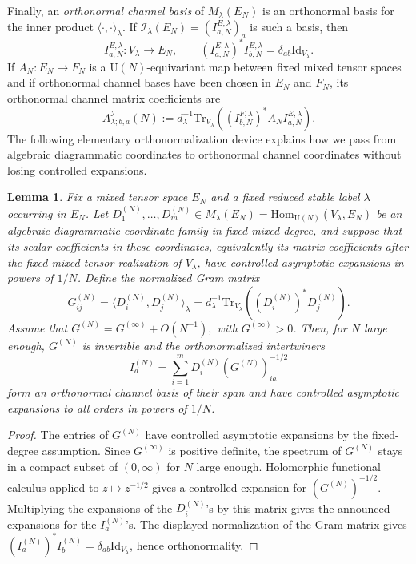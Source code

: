 \documentclass[11pt,a4paper,reqno]{amsart}
\newtheorem{lemma}[theorem]{Lemma}
\theoremstyle{definition}
\theoremstyle{remark}
\newcommand\U{{\mathrm U}}
\newcommand\Tr{{\mathrm{Tr}}}
\newcommand\Id{{\mathrm{Id}}}
\newcommand\Hom{{\mathrm{Hom}}}
\begin{document}
Finally, an \emph{orthonormal channel basis} of $M_\lambda(E_N)$ is an orthonormal basis for the inner product $\langle\cdot,\cdot\rangle_\lambda$.  If $\mathcal I_\lambda(E_N)=(I^{E,\lambda}_{a,N})_a$ is such a basis, then
\[
I^{E,\lambda}_{a,N}:V_\lambda\longrightarrow E_N,
\qquad
(I^{E,\lambda}_{a,N})^*I^{E,\lambda}_{b,N}=\delta_{ab}\Id_{V_\lambda}.
\]
If $A_N:E_N\to F_N$ is a $\U(N)$-equivariant map between fixed mixed tensor spaces and if orthonormal channel bases have been chosen in $E_N$ and $F_N$, its orthonormal channel matrix coefficients are
\begin{equation}\label{eq:orthonormal-channel-coordinates}
A^{\mathcal I}_{\lambda;b,a}(N)
:=d_\lambda^{-1}\Tr_{V_\lambda}\!\left((I^{F,\lambda}_{b,N})^*A_NI^{E,\lambda}_{a,N}\right).
\end{equation}
The following elementary orthonormalization device explains how we pass from algebraic diagrammatic coordinates to orthonormal channel coordinates without losing controlled expansions.

\begin{lemma}\label{lem:fixed-degree-orthonormalization}
Fix a mixed tensor space $E_N$ and a fixed reduced stable label $\lambda$ occurring in $E_N$. Let $D^{(N)}_1,\ldots,D^{(N)}_m\in M_\lambda(E_N)=\Hom_{\U(N)}(V_\lambda,E_N)$ be an algebraic diagrammatic coordinate family in fixed mixed degree, and suppose that its scalar coefficients in these coordinates, equivalently its matrix coefficients after the fixed mixed-tensor realization of $V_\lambda$, have controlled asymptotic expansions in powers of $1/N$. Define the normalized Gram matrix
\[
G^{(N)}_{ij}=\langle D^{(N)}_i,D^{(N)}_j\rangle_\lambda
=d_\lambda^{-1}\Tr_{V_\lambda}\!\left((D^{(N)}_i)^*D^{(N)}_j\right).
\]
Assume that $G^{(N)}=G^{(\infty)}+O(N^{-1}),$ with $G^{(\infty)}>0$. Then, for $N$ large enough, $G^{(N)}$ is invertible and the orthonormalized intertwiners
\[
I^{(N)}_a=
\sum_{i=1}^m D^{(N)}_i (G^{(N)})^{-1/2}_{ia}
\]
form an orthonormal channel basis of their span and have controlled asymptotic expansions to all orders in powers of $1/N$.
\end{lemma}

\begin{proof}
The entries of $G^{(N)}$ have controlled asymptotic expansions by the fixed-degree assumption. Since $G^{(\infty)}$ is positive definite, the spectrum of $G^{(N)}$ stays in a compact subset of $(0,\infty)$ for $N$ large enough. Holomorphic functional calculus applied to $z\mapsto z^{-1/2}$ gives a controlled expansion for $(G^{(N)})^{-1/2}$. Multiplying the expansions of the $D^{(N)}_i$'s by this matrix gives the announced expansions for the $I^{(N)}_a$'s. The displayed normalization of the Gram matrix gives $(I^{(N)}_a)^*I^{(N)}_b=\delta_{ab}\Id_{V_\lambda}$, hence orthonormality.
\end{proof}
\end{document}
